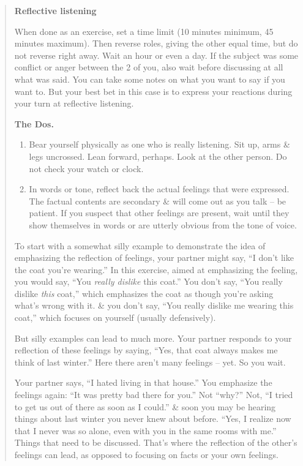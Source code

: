 \documentclass{article}
\numberwithin{equation}{section}
\begin{document}
\begin{quotation}
	\textbf{Reflective listening}
	
	When done as an exercise, set a time limit (10 minutes minimum, 45 minutes maximum). Then reverse roles, giving the other equal time, but do not reverse right away. Wait an hour or even a day. If the subject was some conflict or anger between the 2 of you, also wait before discussing at all what was said. You can take some notes on what you want to say if you want to. But your best bet in this case is to express your reactions during your turn at reflective listening.
	
	\textbf{The Dos.}
	\begin{enumerate}
		\item Bear yourself physically as one who is really listening. Sit up, arms \& legs uncrossed. Lean forward, perhaps. Look at the other person. Do not check your watch or clock.
		\item In words or tone, reflect back the actual feelings that were expressed. The factual contents are secondary \& will come out as you talk -- be patient. If you suspect that other feelings are present, wait until they show themselves in words or are utterly obvious from the tone of voice.
	\end{enumerate}
	To start with a somewhat silly example to demonstrate the idea of emphasizing the reflection of feelings, your partner might say, ``I don't like the coat you're wearing.'' In this exercise, aimed at emphasizing the feeling, you would say, ``You \textit{really dislike} this coat.'' You don't say, ``You really dislike \textit{this} coat,'' which emphasizes the coat as though you're asking what's wrong with it. \& you don't say, ``You really dislike me wearing this coat,'' which focuses on yourself (usually defensively).
	
	But silly examples can lead to much more. Your partner responds to your reflection of these feelings by saying, ``Yes, that coat always makes me think of last winter.'' Here there aren't many feelings -- yet. So you wait.
	
	Your partner says, ``I hated living in that house.'' You emphasize the feelings again: ``It was pretty bad there for you.'' Not ``why?'' Not, ``I tried to get us out of there as soon as I could.'' \& soon you may be hearing things about last winter you never knew about before. ``Yes, I realize now that I never was so alone, even with you in the same rooms with me.'' Things that need to be discussed. That's where the reflection of the other's feelings can lead, as opposed to focusing on facts or your own feelings.
	

\end{quotation}
\end{document}
